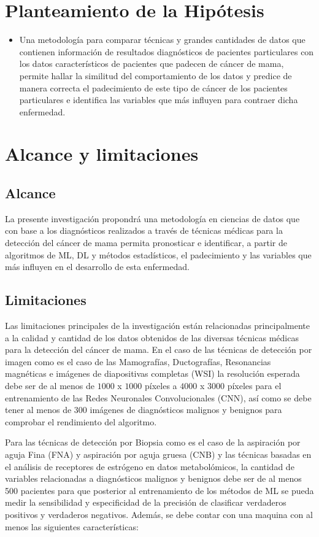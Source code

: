 \section{Planteamiento de la Hipótesis}
\begin{itemize}
	\item Una metodología para comparar técnicas y grandes cantidades de datos que contienen información de resultados diagnósticos de pacientes particulares con los datos característicos de pacientes que padecen de cáncer de mama, permite hallar la similitud del comportamiento de los datos y predice de manera correcta el padecimiento de este tipo de cáncer de los pacientes particulares e identifica las variables que más influyen para contraer dicha enfermedad. 
\end{itemize}

\newpage
\section{Alcance y limitaciones}
\subsection{Alcance}
La presente investigación propondrá una metodología en ciencias de datos que con base a los diagnósticos realizados a través de técnicas médicas para la detección del cáncer de mama permita pronosticar e identificar, a partir de algoritmos de ML, DL y métodos estadísticos, el padecimiento y las variables que más influyen en el desarrollo de esta enfermedad.

\subsection{Limitaciones}
Las limitaciones principales de la investigación están relacionadas principalmente a la calidad y cantidad de los datos obtenidos de las diversas técnicas médicas para la detección del cáncer de mama. En el caso de las técnicas de detección por imagen como es el caso de las Mamografías, Ductografías, Resonancias magnéticas e imágenes de diapositivas completas (WSI) la resolución esperada debe ser de al menos de $1000$ x $1000$ píxeles  a $4000$ x $3000$ píxeles para el entrenamiento de las Redes Neuronales Convolucionales (CNN), así como se debe tener al menos de 300 imágenes de diagnósticos malignos y benignos para comprobar el rendimiento del algoritmo. 

Para las técnicas de detección por Biopsia como es el caso de la aspiración por aguja Fina (FNA) y aspiración por aguja gruesa (CNB) y las técnicas basadas en el análisis de receptores de estrógeno en datos metabolómicos, la cantidad de variables relacionadas a diagnósticos malignos y benignos debe ser de al menos 500 pacientes para que posterior al entrenamiento de los métodos de ML se pueda medir la sensibilidad y especificidad  de la precisión de clasificar verdaderos positivos y verdaderos negativos. Además, se debe contar con una maquina con al menos las siguientes características:


